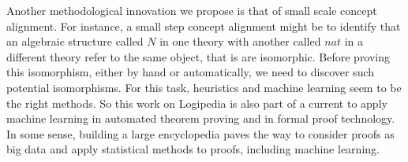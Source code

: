 Another methodological innovation we propose is that of small scale
concept alignment. For instance, a small step concept alignment might
be to identify that an algebraic structure called $N$ in one theory
with another called $nat$ in a different theory refer to the same
object, that is are isomorphic. Before proving this isomorphism,
either by hand or automatically, we need to discover such potential
isomorphisms. For this task, heuristics and machine learning seem to
be the right methods. So this work on Logipedia is also part of a
current to apply machine learning in automated theorem proving and in
formal proof technology. In some sense, building a large encyclopedia
paves the way to consider proofs as big data and apply statistical
methods to proofs, including machine learning.

